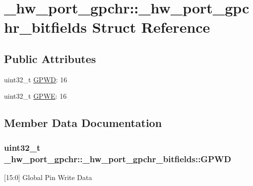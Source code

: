 \hypertarget{struct__hw__port__gpchr_1_1__hw__port__gpchr__bitfields}{}\section{\+\_\+hw\+\_\+port\+\_\+gpchr\+:\+:\+\_\+hw\+\_\+port\+\_\+gpchr\+\_\+bitfields Struct Reference}
\label{struct__hw__port__gpchr_1_1__hw__port__gpchr__bitfields}
\subsection*{Public Attributes}
\begin{DoxyCompactItemize}
\item 
uint32\+\_\+t \hyperlink{struct__hw__port__gpchr_1_1__hw__port__gpchr__bitfields_a26f9798f6bf5860a6dfcca84f3ee58a8}{G\+P\+WD}\+: 16
\item 
uint32\+\_\+t \hyperlink{struct__hw__port__gpchr_1_1__hw__port__gpchr__bitfields_adcfba2c98b242c902fc11680789314e7}{G\+P\+WE}\+: 16
\end{DoxyCompactItemize}


\subsection{Member Data Documentation}
\subsubsection[{\texorpdfstring{G\+P\+WD}{GPWD}}]{\setlength{\rightskip}{0pt plus 5cm}uint32\+\_\+t \+\_\+hw\+\_\+port\+\_\+gpchr\+::\+\_\+hw\+\_\+port\+\_\+gpchr\+\_\+bitfields\+::\+G\+P\+WD}\hypertarget{struct__hw__port__gpchr_1_1__hw__port__gpchr__bitfields_a26f9798f6bf5860a6dfcca84f3ee58a8}{}\label{struct__hw__port__gpchr_1_1__hw__port__gpchr__bitfields_a26f9798f6bf5860a6dfcca84f3ee58a8}
\mbox{[}15\+:0\mbox{]} Global Pin Write Data 
